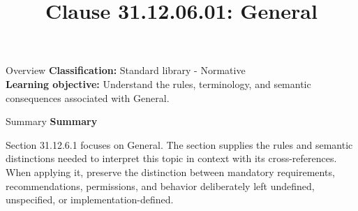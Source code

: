 \documentclass[10pt,letterpaper]{article}
\title{Clause 31.12.06.01: General}
\author{}
\date{}
\begin{document}
\maketitle
\begin{CornellOverviewBox}{Overview}
\textbf{Classification:} Standard library - Normative\\[2pt]
\textbf{Learning objective:} Understand the rules, terminology, and semantic consequences associated with General.
\end{CornellOverviewBox}\begin{CornellSummaryBox}{Summary}
{\sffamily\bfseries\color{Accent} Summary}\par\vspace{3pt}Section 31.12.6.1 focuses on General. The section supplies the rules and semantic distinctions needed to interpret this topic in context with its cross-references. When applying it, preserve the distinction between mandatory requirements, recommendations, permissions, and behavior deliberately left undefined, unspecified, or implementation-defined.
\end{CornellSummaryBox}
\end{document}
